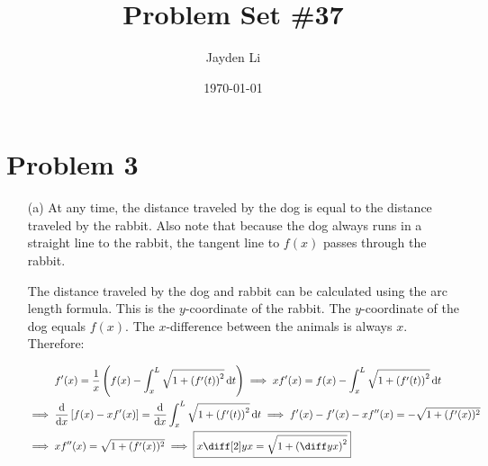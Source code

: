 \documentclass[preview, margin=0.6in]{standalone}
\title{\vspace*{-30pt}Problem Set \#37}
\author{Jayden Li}
\date{\today}
\newcommand*{\problem}[1]{\section*{Problem #1}}
\newcommand*{\deriv}[1][x]{\ensuremath{\dfrac{\mathrm{d}}{\mathrm{d}#1}}}
\begin{document}
\fontsize{12pt}{12pt}\selectfont
\setlength{\abovedisplayskip}{0pt}
\setlength{\parindent}{0pt}
\setlength{\parskip}{2ex plus 0.5ex minus 0.2ex}
\maketitle

\problem{3}
\begin{itemize}
	\item[(a)]
		At any time, the distance traveled by the dog is equal to the distance traveled by the rabbit. Also note that because the dog always runs in a straight line to the rabbit, the tangent line to $f(x)$ passes through the rabbit.

		The distance traveled by the dog and rabbit can be calculated using the arc length formula. This is the $y$-coordinate of the rabbit. The $y$-coordinate of the dog equals $f(x)$. The $x$-difference between the animals is always $x$. Therefore:

		$\begin{aligned}[t]
			&f'(x)=\frac1x\left(f(x)-\int_{x}^{L}\sqrt{1+\left(f'(t)\right)^2}\,\mathrm{d}t\right)
			\implies xf'(x)=f(x)-\int_{x}^{L}\sqrt{1+\left(f'(t)\right)^2}\,\mathrm{d}t \\
			\implies{}& \deriv[x]\left[f(x)-xf'(x)\right]=\deriv[x]\int_{x}^{L}\sqrt{1+\left(f'(t)\right)^2}\,\mathrm{d}t
			\implies f'(x)-f'(x)-xf''(x)=-\sqrt{1+(f'(x))^2} \\
			\implies{}& xf''(x)=\sqrt{1+(f'(x))^2}
			\implies \boxed{x\diff[2]yx=\sqrt{1+\left(\diff yx\right)^2}}
		\end{aligned}$


\end{itemize}
\end{document}
